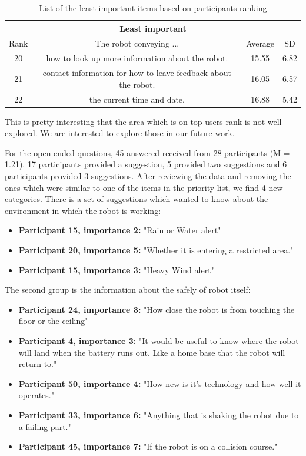\documentclass[letterpaper, 10 pt, conference]{ieeeconf}  %
\begin{document}
\begin {table}[H]
\begin{center}
\label{table:leastImp}

\begin{tabular}{| c | c | c | c |}
 \hline
  \multicolumn{4}{|c|}{Least important} \\
 \hline
 Rank & The robot conveying ... & Average & SD \\
 \hline
 20 & how to look up more information about the robot. & 15.55 & 6.82 \\
 \hline
 21 & contact information for how to leave feedback about the robot. & 16.05  & 6.57 \\
 \hline
 22 & the current time and date. & 16.88 & 5.42 \\
\hline
\end{tabular}
\end{center}
\caption{List of the least important items based on participants ranking}
\end{table}

This is pretty interesting that the area which is on top users rank is not well explored. We are interested to explore those in our future work.




For the open-ended questions, 45 answered received from 28 participants (M = 1.21). 17 participants provided a suggestion, 5 provided two suggestions and 6 participants provided 3 suggestions. After reviewing the data and removing the ones which were similar to one of the items in the priority list, we find 4 new categories. There is a set of suggestions which wanted to know about the environment in which the robot is working: 
\begin{itemize}
    \item  \textbf{Participant 15, importance 2:} "Rain or Water alert"
    \item  \textbf{Participant 20, importance 5:} "Whether it is entering a restricted area."
    \item  \textbf{Participant 15, importance 3:} "Heavy Wind alert"
\end{itemize}



The second group is the information about the safely of robot itself:
\begin{itemize}
    \item  \textbf{Participant 24, importance 3:} "How close the robot is from touching the floor or the ceiling"
    \item  \textbf{Participant 4, importance 3:} "It would be useful to know where the robot will land when the battery runs out. Like a home base that the robot will return to."
    \item  \textbf{Participant 50, importance 4:} "How new is it's technology and how well it operates."
    \item  \textbf{Participant 33, importance 6:} "Anything that is shaking the robot due to a failing part."
    \item  \textbf{Participant 45, importance 7:} "If the robot is on a collision course."
\end{itemize}
\end{document}
